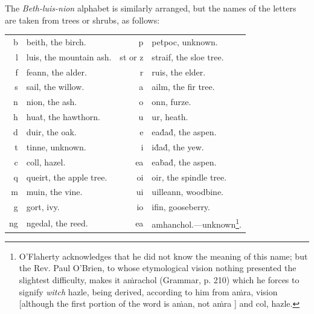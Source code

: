 \documentclass[11pt,oneside]{memoir}
\begin{document}
The \textit{Beth-luis-nion} alphabet is similarly arranged, but the names of the letters are taken from trees or shrubs, as follows:

\begin{tabularx}{\textwidth}{r X r X} 
\gaelicfont b & \gaelicfont beith, \normalfont the birch. & \gaelicfont p & \gaelicfont peṫpoc, \normalfont unknown. \\
\gaelicfont l & \gaelicfont luis, \normalfont the mountain ash. & \gaelicfont st \normalfont or \gaelicfont z & \gaelicfont straif, \normalfont the sloe tree. \\
\gaelicfont f & \gaelicfont feann, \normalfont the alder. & \gaelicfont r & \gaelicfont ruis, \normalfont the elder. \\
\gaelicfont s & \gaelicfont sail, \normalfont the willow. & \gaelicfont a & \gaelicfont ailm, \normalfont the fir tree. \\
\gaelicfont n & \gaelicfont nion, \normalfont the ash. & \gaelicfont o & \gaelicfont onn, \normalfont furze. \\
\gaelicfont h & \gaelicfont huaṫ, \normalfont the hawthorn. & \gaelicfont u & \gaelicfont ur, \normalfont heath. \\
\gaelicfont d & \gaelicfont duir, \normalfont the oak. & \gaelicfont e & \gaelicfont eaḋaḋ, \normalfont the aspen. \\
\gaelicfont t & \gaelicfont tinne, \normalfont unknown. & \gaelicfont i & \gaelicfont iḋaḋ, \normalfont the yew. \\
\gaelicfont c & \gaelicfont coll, \normalfont hazel. & \gaelicfont ea & \gaelicfont eaḃaḋ, \normalfont the aspen. \\
\gaelicfont q & \gaelicfont queirt, \normalfont the apple tree. & \gaelicfont oi & \gaelicfont oir, \normalfont the spindle tree. \\
\gaelicfont m & \gaelicfont muin, \normalfont the vine. & \gaelicfont ui & \gaelicfont uilleann, \normalfont woodbine. \\
\gaelicfont g & \gaelicfont gort, \normalfont ivy. & \gaelicfont io & \gaelicfont ifin, \normalfont gooseberry. \\
\gaelicfont ng & \gaelicfont ngedal, \normalfont the reed. & \gaelicfont ea & \gaelicfont amhanchol.\normalfont---unknown\footnote{
    O'Flaherty acknowledges that he did not know the meaning of this name; but the Rev. Paul O'Brien, to whose etymological vision nothing presented the slightest difficulty, makes it \gaelicfont aṁrachol %
    \normalfont (Grammar, p. 210) which he forces to signify \textit{witch} hazle, %
    being derived, according to him from \gaelicfont aṁra, \normalfont vision [although the first portion of the word is \gaelicfont aṁan, \normalfont not \gaelicfont aṁra \normalfont] and \gaelicfont col, \normalfont hazle.
}. \\
\end{tabularx}
\end{document}
